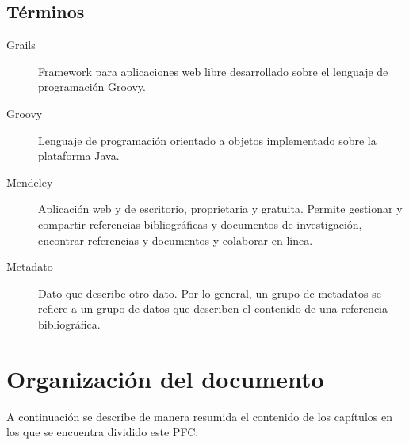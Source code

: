 \subsection{Términos}
\begin{description}
	\item [Grails]	Framework para aplicaciones web libre desarrollado sobre el lenguaje de programación Groovy.
	\item [Groovy]	Lenguaje de programación orientado a objetos implementado sobre la plataforma Java.
	\item [Mendeley]	Aplicación web y de escritorio, proprietaria y gratuita. Permite gestionar y compartir referencias bibliográficas y documentos de investigación, encontrar referencias y documentos y colaborar en línea.
	\item [Metadato]	Dato que describe otro dato. Por lo general, un grupo de metadatos se refiere a un grupo de datos que describen el contenido de una referencia bibliográfica.
\end{description}

\section{Organización del documento}
A continuación se describe de manera resumida el contenido de los capítulos en los que se encuentra dividido este PFC:

